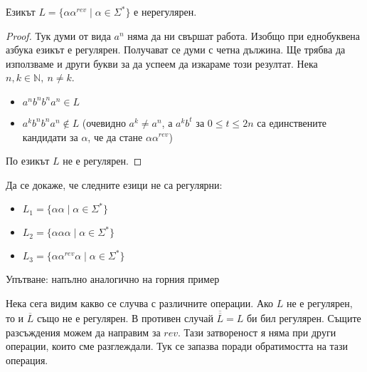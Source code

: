\begin{claim}
    Езикът $L = \{ \alpha \alpha^{rev} \mid \alpha \in \Sigma^* \}$ е нерегулярен.
\end{claim}

\begin{proof}
    Тук думи от вида $a^n$ няма да ни свършат работа.
    Изобщо при еднобуквена азбука езикът е регулярен.
    Получават се думи с четна дължина.
    Ще трябва да използваме и други букви за да успеем да изкараме този резултат.
    Нека $n, k \in \mathbb{N}, \: n \neq k$.
    \begin{itemize}
        \item $a^nb^nb^na^n \in L$
        \item $a^kb^nb^na^n \notin L$ (очевидно $a^k \neq a^n$, а $a^kb^t$ за $0 \leq t \leq 2n$ са единствените кандидати за $\alpha$, че да стане $\alpha \alpha^{rev}$)
    \end{itemize}
    По  езикът $L$ не е регулярен.
\end{proof}

\begin{problem}
Да се докаже, че следните езици не са регулярни:
\begin{itemize}
    \item $L_1 = \{ \alpha \alpha \mid \alpha \in \Sigma^* \}$
    \item $L_2 = \{ \alpha \alpha \alpha \mid \alpha \in \Sigma^* \}$
    \item $L_3 = \{ \alpha \alpha^{rev} \alpha \mid \alpha \in \Sigma^* \}$
\end{itemize}
Упътване: напълно аналогично на горния пример
\end{problem}

Нека сега видим какво се случва с различните операции.
Ако $L$ не е регулярен, то и $\overline{L}$ също не е регулярен.
В противен случай $\overline{\overline{L}} = L$ би бил регулярен.
Същите разсъждения можем да направим за $rev$.
Тази затвореност я няма при други операции, които сме разглеждали.
Тук се запазва поради обратимостта на тази операция.

